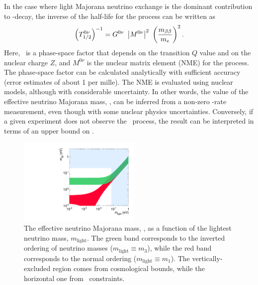 In the case where light Majorana neutrino exchange is the dominant contribution to \bbonu-decay, the inverse of the half-life for the process can be written as
\begin{equation}
\left(T^{0\nu}_{1/2}\right)^{-1} = G^{0\nu}\ \left|M^{0\nu}\right|^2\ \left(\frac{\mbb}{m_{e}}\right)^2.
\label{eq:Tonu}
\end{equation}
Here, \Gonu\ is a phase-space factor that depends on the transition $Q$ value and on the nuclear charge $Z$, and $M^{0\nu}$ is the nuclear matrix element (NME) for the process. The phase-space factor can be calculated analytically with sufficient accuracy (error estimates of about 1 per mille). The NME is evaluated using nuclear models, although with considerable uncertainty. In other words, the value of the effective neutrino Majorana mass, \mbb, can be inferred from a non-zero \bbonu-rate measurement, even though with some nuclear physics uncertainties. Conversely, if a given experiment does not observe the \bbonu\ process, the result can be interpreted in terms of an upper bound on \mbb.  

\begin{figure}
\centering
\includegraphics[width=0.525\textwidth]{img/BetaBetaVsLight.pdf}
\caption{The effective neutrino Majorana mass, \mbb, as a function of the lightest neutrino mass, $m_\mathrm{light}$. The green band corresponds to the inverted ordering of neutrino masses ($m_\mathrm{light}\equiv m_{3}$), while the red band corresponds to the normal ordering ($m_\mathrm{light}\equiv m_{1}$). The vertically-excluded region comes from cosmological bounds, while the horizontal one from \bbonu\ constraints.} \label{fig:BetaBetaVsLight}
\end{figure}


